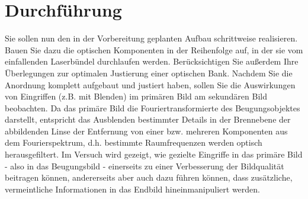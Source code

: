 \section{Durchführung}
Sie sollen nun den in der Vorbereitung geplanten Aufbau schrittweise realisieren. Bauen Sie dazu die
optischen Komponenten in der Reihenfolge auf, in der sie vom einfallenden Laserbündel durchlaufen
werden. Berücksichtigen Sie außerdem Ihre Überlegungen zur optimalen Justierung einer optischen
Bank.
Nachdem Sie die Anordnung komplett aufgebaut und justiert haben, sollen Sie die Auswirkungen
von Eingriffen (z.B. mit Blenden) im primären Bild am sekundären Bild beobachten. Da das primäre
Bild die Fouriertransformierte des Beugungsobjektes darstellt, entspricht das Ausblenden bestimmter
Details in der Brennebene der abbildenden Linse der Entfernung von einer bzw. mehreren Komponenten
aus dem Fourierspektrum, d.h. bestimmte Raumfrequenzen werden optisch herausgefiltert.
Im Versuch wird gezeigt, wie gezielte Eingriffe in das primäre Bild - also in das Beugungsbild - einerseits
zu einer Verbesserung der Bildqualität beitragen können, andererseits aber auch dazu führen
können, dass zusätzliche, vermeintliche Informationen in das Endbild hineinmanipuliert werden.
